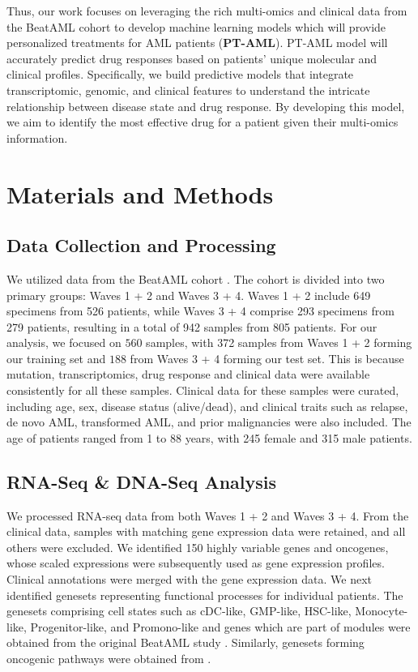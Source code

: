 \documentclass[runningheads,10pt]{llncs}
\begin{document}
Thus, our work focuses on leveraging the rich multi-omics and clinical data from the BeatAML cohort to develop machine learning models \cite{lecun2015deep} which will provide personalized treatments for AML patients (\textbf{PT-AML}). PT-AML model will accurately predict drug responses based on patients' unique molecular and clinical profiles.  
Specifically, we build predictive models that integrate transcriptomic, genomic, and clinical features to understand the intricate relationship between disease state and drug response. 
By developing this model, we aim to identify the most effective drug for a patient given their multi-omics information.
\section{Materials and Methods}
\subsection{Data Collection and Processing} 
We utilized data from the BeatAML cohort \cite{bottomly2022integrative}. The cohort is divided into two primary groups: Waves 1 + 2 and Waves 3 + 4. Waves 1 + 2 include 649 specimens from 526 patients, while Waves 3 + 4 comprise 293 specimens from 279 patients, resulting in a total of 942 samples from 805 patients. For our analysis, we focused on $560$ samples, with 372 samples from Waves 1 + 2 forming our training set and $188$ from Waves 3 + 4 forming our test set. This is because mutation, transcriptomics, drug response and clinical data were available consistently for all these samples. Clinical data for these samples were curated, including age, sex, disease status (alive/dead), and clinical traits such as relapse, de novo AML, transformed AML, and prior malignancies were also included. The age of patients ranged from 1 to 88 years, with 245 female and 315 male patients. %
\subsection{RNA-Seq \& DNA-Seq Analysis}
We processed RNA-seq data from both Waves 1 + 2 and Waves 3 + 4. From the clinical data, samples with matching gene expression data were retained, and all others were excluded. We identified 150 highly variable genes and oncogenes, whose scaled expressions were subsequently used as gene expression profiles. Clinical annotations were merged with the gene expression data. We next identified genesets representing functional processes for individual patients. The genesets comprising cell states such as cDC-like, GMP-like, HSC-like, Monocyte-like, Progenitor-like, and Promono-like and genes which are part of modules were obtained from the original BeatAML study \cite{bottomly2022integrative}. Similarly, genesets forming oncogenic pathways were obtained from \cite{roelands2020oncogenic}. 
\end{document}
